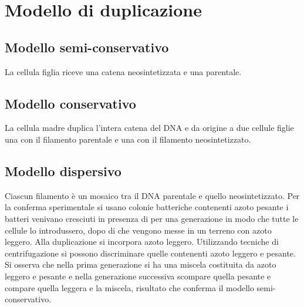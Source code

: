 \section{Modello di duplicazione}
\subsection{Modello semi-conservativo}
La cellula figlia riceve una catena neosintetizzata e una parentale.
\subsection{Modello conservativo}
La cellula madre duplica l'intera catena del DNA e da origine a due cellule figlie una con il filamento parentale e una con il filamento neosintetizzato. 
\subsection{Modello dispersivo}
Ciascun filamento \`e un mosaico tra il DNA parentale e quello neosintetizzato. 
Per la conferma sperimentale si usano colonie batteriche contenenti azoto pesante  i batteri venivano cresciuti in presenza di  per una generazione in modo che tutte le
cellule lo introdussero, dopo di che vengono messe in un terreno con azoto leggero. Alla  duplicazione si incorpora azoto leggero. Utilizzando tecniche di centrifugazione si possono 
discriminare quelle contenenti azoto leggero e pesante. Si osserva che nella prima generazione si ha una miscela costituita da azoto leggero e pesante e nella generazione successiva 
scompare quella pesante e compare quella leggera e la miscela, risultato che conferma il modello semi-conservativo. 

